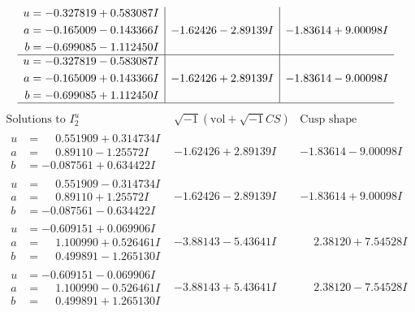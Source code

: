 \documentclass[1p]{elsarticle_modified}
\theoremstyle{definition}
\newcommand{\I}{\sqrt{-1}}
\begin{document}
$$\begin{array}{c|c|c}
\begin{aligned}
u &= -0.327819 + 0.583087 I \\
a &= -0.165009 - 0.143366 I \\
b &= -0.699085 - 1.112450 I\end{aligned}
 & -1.62426 - 2.89139 I & -1.83614 + 9.00098 I \\ \hline\begin{aligned}
u &= -0.327819 - 0.583087 I \\
a &= -0.165009 + 0.143366 I \\
b &= -0.699085 + 1.112450 I\end{aligned}
 & -1.62426 + 2.89139 I & -1.83614 - 9.00098 I\\
 \hline 
 \end{array}$$\newpage$$\begin{array}{c|c|c}  
\text{Solutions to }I^u_{2}& \I (\text{vol} + \sqrt{-1}CS) & \text{Cusp shape}\\
 \hline 
\begin{aligned}
u &= \phantom{-}0.551909 + 0.314734 I \\
a &= \phantom{-}0.89110 - 1.25572 I \\
b &= -0.087561 + 0.634422 I\end{aligned}
 & -1.62426 + 2.89139 I & -1.83614 - 9.00098 I \\ \hline\begin{aligned}
u &= \phantom{-}0.551909 - 0.314734 I \\
a &= \phantom{-}0.89110 + 1.25572 I \\
b &= -0.087561 - 0.634422 I\end{aligned}
 & -1.62426 - 2.89139 I & -1.83614 + 9.00098 I \\ \hline\begin{aligned}
u &= -0.609151 + 0.069906 I \\
a &= \phantom{-}1.100990 + 0.526461 I \\
b &= \phantom{-}0.499891 - 1.265130 I\end{aligned}
 & -3.88143 - 5.43641 I & \phantom{-}2.38120 + 7.54528 I \\ \hline\begin{aligned}
u &= -0.609151 - 0.069906 I \\
a &= \phantom{-}1.100990 - 0.526461 I \\
b &= \phantom{-}0.499891 + 1.265130 I\end{aligned}
 & -3.88143 + 5.43641 I & \phantom{-}2.38120 - 7.54528 I \\ \hline\begin{aligned}

\end{aligned}
\end{array}$$
\end{document}
